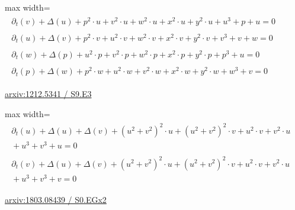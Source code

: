 \documentclass[10pt,a4paper]{article}
\begin{document}
\begin{minipage}{\linewidth}
\begin{center}\begin{adjustbox}{max width=\linewidth}$\displaystyle\begin{gathered}\begin{gathered}\partial_{t}(v)+\Delta(u)+p^{2}\cdot u+v^{2}\cdot u+w^{2}\cdot u+x^{2}\cdot u+y^{2}\cdot u+u^{3}+p+u=0\end{gathered}\\[5pt]\begin{gathered}\partial_{t}(u)+\Delta(v)+p^{2}\cdot v+u^{2}\cdot v+w^{2}\cdot v+x^{2}\cdot v+y^{2}\cdot v+v^{3}+v+w=0\end{gathered}\\[5pt]\begin{gathered}\partial_{t}(w)+\Delta(p)+u^{2}\cdot p+v^{2}\cdot p+w^{2}\cdot p+x^{2}\cdot p+y^{2}\cdot p+p^{3}+u=0\end{gathered}\\[5pt]\begin{gathered}\partial_{t}(p)+\Delta(w)+p^{2}\cdot w+u^{2}\cdot w+v^{2}\cdot w+x^{2}\cdot w+y^{2}\cdot w+w^{3}+v=0\end{gathered}\end{gathered}$\end{adjustbox}\end{center}
{\small \href{https://arxiv.org/html/1212.5341#S9.E3}{arxiv:1212.5341 / S9.E3}}\par
\end{minipage}\par\vspace{7mm}

\begin{minipage}{\linewidth}
\begin{center}\begin{adjustbox}{max width=\linewidth}$\displaystyle\begin{gathered}\begin{gathered}\partial_{t}(u)+\Delta(u)+\Delta(v)+(u^{2}+v^{2})^{2}\cdot u+(u^{2}+v^{2})^{2}\cdot v+u^{2}\cdot v+v^{2}\cdot u\\[-1pt]{}+u^{3}+v^{3}+u=0\end{gathered}\\[5pt]\begin{gathered}\partial_{t}(v)+\Delta(u)+\Delta(v)+(u^{2}+v^{2})^{2}\cdot u+(u^{2}+v^{2})^{2}\cdot v+u^{2}\cdot v+v^{2}\cdot u\\[-1pt]{}+u^{3}+v^{3}+v=0\end{gathered}\end{gathered}$\end{adjustbox}\end{center}
{\small \href{https://arxiv.org/html/1803.08439#S0.EGx2}{arxiv:1803.08439 / S0.EGx2}}\par
\end{minipage}\par\vspace{7mm}
\end{document}
